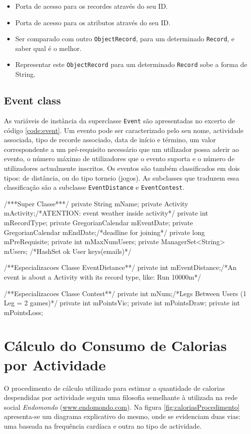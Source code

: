 \documentclass[a4paper,10pt]{report}
\begin{document}
\begin{itemize}
 \item Porta de acesso para os recordes através do seu ID.
 \item Porta de acesso para os atributos através do seu ID.
 \item Ser comparado com outro \verb!ObjectRecord!, para um determinado \verb!Record!, e saber qual é o melhor.
 \item Representar este \verb!ObjectRecord! para um determinado \verb!Record! sobe a forma de String.
\end{itemize}

\section{Event class}
\label{sec:event}
As variáveis de instância da superclasse \verb!Event! são apresentadas no excerto de código \ref{code:event}.
Um evento pode ser caracterizado pelo seu nome, actividade associada, tipo de recorde associado, 
data de início e término, um valor correspondente a um pré-requisito necessário que um utilizador possa aderir ao evento, 
o número máximo de utilizadores que o evento suporta e o número de utilizadores actualmente inscritos.
Os eventos são também classificados em dois tipos: de distância, ou do tipo torneio (jogos).
As subclasses que traduzem essa classificação são a subclasse \verb!EventDistance! e \verb!EventContest!.

\begin{code}[caption=Variáveis de instância da superclasse Event e subclasses respectivas (src/model/event)., label=code:event]
/***Super Classe***/
private String mName;
private Activity mActivity;/*ATENTION: event weather inside activity*/
private int mRecordType;
private GregorianCalendar mEventDate;
private GregorianCalendar mEndDate;/*deadline for joining*/
private long mPreRequisite;
private int mMaxNumUsers;
private ManagerSet<String> mUsers; /*HashSet ok User keys(emails)*/

/**Especializacoes Classe EventDistance**/
private int mEventDistance;/*An event is about a Activity with its record type, like: Run 10000m*/

/**Especializacoes Classe Contest**/
private int mNum;/*Legs Between Users (1 Leg = 2 games)*/
private int mPointsVic;
private int mPointsDraw;
private int mPointsLoss;
\end{code}

\chapter{Cálculo do Consumo de Calorias por Actividade}
\label{cap:calorias}
O procedimento de cálculo utilizado para estimar a quantidade de calorias despendidas por actividade seguiu uma filosofia semelhante à utilizada 
na rede social \emph{Endomondo} (\url{www.endomondo.com}). 
Na figura \ref{fig:caloriasProcedimento} apresenta-se um diagrama explicativo do mesmo, onde se evidenciam duas vias: uma baseada na frequência 
cardíaca e outra no tipo de actividade.
\end{document}
